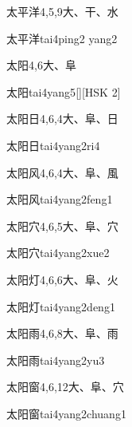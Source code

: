 \begin{entry}{太平洋}{4,5,9}{⼤、⼲、⽔}
  \begin{phonetics}{太平洋}{tai4ping2 yang2}
  \end{phonetics}
\end{entry}

\begin{entry}{太阳}{4,6}{⼤、⾩}
  \begin{phonetics}{太阳}{tai4yang5}[][HSK 2]
  \end{phonetics}
\end{entry}

\begin{entry}{太阳日}{4,6,4}{⼤、⾩、⽇}
  \begin{phonetics}{太阳日}{tai4yang2ri4}
  \end{phonetics}
\end{entry}

\begin{entry}{太阳风}{4,6,4}{⼤、⾩、⾵}
  \begin{phonetics}{太阳风}{tai4yang2feng1}
  \end{phonetics}
\end{entry}

\begin{entry}{太阳穴}{4,6,5}{⼤、⾩、⽳}
  \begin{phonetics}{太阳穴}{tai4yang2xue2}
  \end{phonetics}
\end{entry}

\begin{entry}{太阳灯}{4,6,6}{⼤、⾩、⽕}
  \begin{phonetics}{太阳灯}{tai4yang2deng1}
  \end{phonetics}
\end{entry}

\begin{entry}{太阳雨}{4,6,8}{⼤、⾩、⾬}
  \begin{phonetics}{太阳雨}{tai4yang2yu3}
  \end{phonetics}
\end{entry}

\begin{entry}{太阳窗}{4,6,12}{⼤、⾩、⽳}
  \begin{phonetics}{太阳窗}{tai4yang2chuang1}
  \end{phonetics}
\end{entry}

